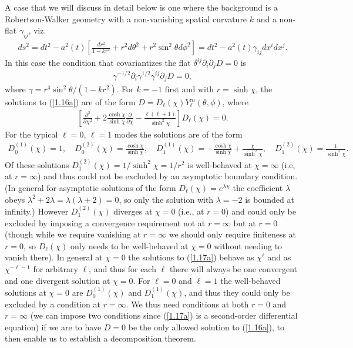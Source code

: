\documentclass[aps,onecolumn,10pt]{revtex4}
\numberwithin{equation}{section}
\numberwithin{equation}{section}
\begin{document}
A case that we will discuss in detail below is one where the background is a Robertson-Walker geometry with a non-vanishing spatial curvature $k$ and a non-flat $\gamma_{ij}$, viz.
%
\begin{align}
ds^2=dt^2-a^2(t)\left[\frac{dr^2}{1-kr^2}+r^2d\theta^2+r^2\sin^2\theta d\phi^2\right]=dt^2-a^2(t)\gamma_{ij}dx^idx^j.
\label{1.15a}
\end{align}
%
In this case the condition that covariantizes the flat $\delta^{ij}\partial_i\partial_jD=0$ is
%
\begin{align}
\gamma^{-1/2}\partial_i\gamma^{1/2}\gamma^{ij}\partial_jD=0,
\label{1.16a}
\end{align}
%
where $\gamma=r^4\sin^2\theta/(1-kr^2)$. For $k=-1$ first and with $r=\sinh\chi$, the solutions to (\ref{1.16a}) are of the form $D=D_{\ell}(\chi)Y^m_{\ell}(\theta,\phi)$, where
%
\begin{align}
\left[\frac{\partial^2}{\partial \chi^2}+2\frac{\cosh\chi}{\sinh\chi}\frac{\partial}{\partial \chi}-\frac{\ell(\ell+1)}{\sinh^2\chi}\right]D_{\ell}(\chi)=0.
\label{1.17a}
\end{align}
%
For the typical $\ell=0$, $\ell=1$ modes  the solutions are of the form
%
\begin{align}
D^{(1)}_{0}(\chi)=1,\quad D^{(2)}_{0}(\chi)=\frac{\cosh\chi}{\sinh\chi},\quad D^{(1)}_{1}(\chi)=-\frac{\cosh\chi}{\sinh\chi}+\frac{\chi}{\sinh^2\chi},\quad D^{(2)}_{1}(\chi)=\frac{1}{\sinh^2\chi}.
\label{1.18a}
\end{align}
%
Of these solutions $D^{(2)}_{1}(\chi)=1/\sinh^2\chi=1/r^2$ is well-behaved at $\chi=\infty$ (i.e, at $r=\infty$) and thus could not be excluded by an asymptotic boundary condition. (In general for asymptotic solutions of the form $D_{\ell}(\chi)=e^{\lambda\chi}$ the coefficient $\lambda$ obeys $\lambda^2+2\lambda=\lambda(\lambda+2)=0$, so only the solution with $\lambda=-2$ is bounded at infinity.) However $D^{(2)}_{1}(\chi)$ diverges at $\chi=0$ (i.e., at $r=0$) and could only be excluded by imposing a convergence requirement not at $r=\infty$ but at $r=0$ (though while we require vanishing at $r=\infty$ we should only require finiteness at $r=0$, so $D_{\ell}(\chi)$ only needs to be well-behaved at $\chi=0$ without needing to vanish there). In general at $\chi=0$ the solutions to (\ref{1.17a}) behave as $\chi^{\ell}$ and as $\chi^{-\ell-1}$ for arbitrary $\ell$, and thus for each $\ell$ there will always be one convergent and one divergent solution at $\chi=0$. For $\ell=0$ and $\ell=1$ the well-behaved solutions at $\chi=0$ are $D^{(1)}_{0}(\chi)$ and $D^{(1)}_{1}(\chi)$, and thus they could only be excluded by a condition at $r=\infty$. We thus need conditions at both $r=0$ and $r=\infty$ (we can impose two conditions since (\ref{1.17a}) is a second-order differential equation) if we are to have $D=0$ be the only allowed solution to (\ref{1.16a}), to then enable us to establish a decomposition theorem.
\end{document}

